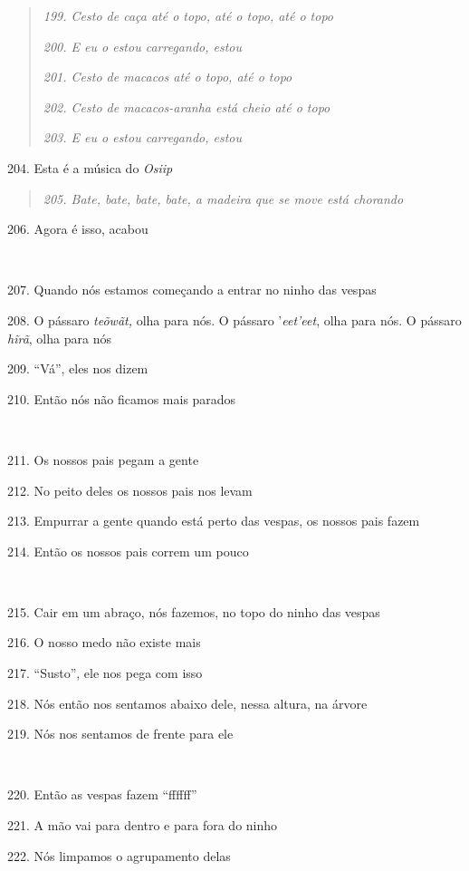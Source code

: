 \begin{quote}
\forceindent\emph{199. Cesto de caça até o topo, até o topo, até o topo}

\emph{200. E eu o estou carregando, estou }

\emph{201. Cesto de macacos até o topo, até o topo}

\emph{202. Cesto de macacos-aranha está cheio até o topo}

\emph{203. E eu o estou carregando, estou}
\end{quote}

204. Esta é a música do \emph{Osiip}

\begin{quote}
\forceindent\emph{205. Bate, bate, bate, bate, a madeira que se move está chorando}
\end{quote}

206. Agora é isso, acabou

~

207. Quando nós estamos começando a entrar no ninho das vespas

208. O pássaro \emph{teõwãt,} olha para nós. O pássaro '\emph{eet'eet},
olha para nós. O pássaro \emph{hĩrã}, olha para nós

209. ``Vá'', eles nos dizem

210. Então nós não ficamos mais parados

~

211. Os nossos pais pegam a gente

212. No peito deles os nossos pais nos levam

213. Empurrar a gente quando está perto das vespas, os nossos pais fazem

214. Então os nossos pais correm um pouco

~

215. Cair em um abraço, nós fazemos, no topo do ninho das vespas

216. O nosso medo não existe mais

217. ``Susto'', ele nos pega com isso

218. Nós então nos sentamos abaixo dele, nessa altura, na árvore

219. Nós nos sentamos de frente para ele

~

220. Então as vespas fazem ``ffffff''

221. A mão vai para dentro e para fora do ninho

222. Nós limpamos o agrupamento delas

